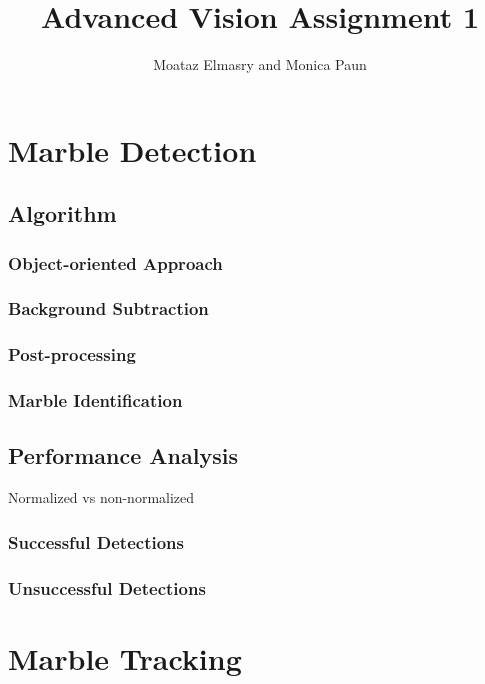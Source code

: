 \documentclass[10pt,a4paper,twocolumn]{report}
\author{Moataz Elmasry and Monica Paun}
\title{Advanced Vision Assignment 1}
\begin{document}
\maketitle

\begin{abstract}

\end{abstract}

\chapter{Marble Detection}

\section{Algorithm}

\subsection{Object-oriented Approach}

\subsection{Background Subtraction}

\subsection{Post-processing}

\subsection{Marble Identification}

\section{Performance Analysis}

Normalized vs non-normalized

\subsection{Successful Detections}

\subsection{Unsuccessful Detections}

\chapter{Marble Tracking}
\end{document}
